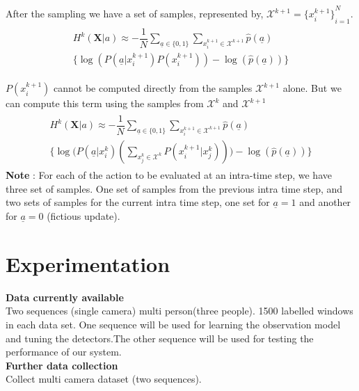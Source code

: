 \documentclass[10pt,twocolumn,letterpaper]{article}
\begin{document}
After the sampling we have a set of samples, represented by,
 $\mathcal{X}^{k+1}={\lbrace x^{k+1}_{i}\rbrace}^{N}_{i=1}$.
\begin{align}
\begin{split}
H^{k}(\textbf{X}| a)\approx -\dfrac{1}{N}\sum_{\underline{a}\in\lbrace 0 ,1 \rbrace} \sum_{x_{i}^{k+1}\in\mathcal{X}^{k+1}} \widehat{p}( \underline{a})\\ \Big\lbrace\log(P( \underline{a}|x^{k+1}_{i})P(x^{k+1}_{i})) - \log(\widehat{p}( \underline{a}))\Big\rbrace
\end{split}
\end{align}

$P(x^{k+1}_{i})$ cannot be computed directly from the samples $\mathcal{X}^{k+1}$ alone. But we can compute this term using the samples from $\mathcal{X}^{k}$ and $\mathcal{X}^{k+1}$
\begin{align}
\begin{split}
H^{k}(\textbf{X}| a)\approx -\dfrac{1}{N}\sum_{\underline{a}\in\lbrace 0 ,1 \rbrace} \sum_{x_{i}^{k+1}\in\mathcal{X}^{k+1}} \widehat{p}( \underline{a}) \\ \Big\lbrace\log\Big(P( \underline{a}|x^{k}_{i})(\sum_{x_{j}^{k}\in\mathcal{X}^{k}}P(x^{k+1}_{i}|x^{k}_{j}))\Big) - \log(\widehat{p}( \underline{a}))\Big\rbrace
\end{split}
\end{align}
\textbf{Note} :
For each of the action to be evaluated at an intra-time step, we have three set of samples. One set of samples from the previous intra time step, and two sets of samples for the current intra time step, one set for $\underline{a}=1$ and another for $\underline{a}=0$ (fictious update).
  
\section{Experimentation}

\textbf{Data currently available}\\ 
Two sequences (single camera) multi person(three people). 1500 labelled windows in each data set. One sequence will be used for learning the observation model and tuning the detectors.The other sequence will be used for testing the performance of our system.\\

\textbf{Further data collection}\\
Collect multi camera dataset (two sequences).\\
\end{document}
